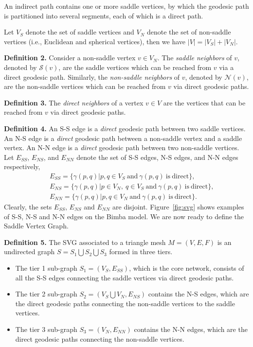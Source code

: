 An indirect path contains one or more saddle vertices, by which the
geodesic path is partitioned into several segments, each of which is
a direct path.

Let $V_S$ denote the set of saddle vertices and $V_N$ denote the set
of non-saddle vertices (i.e., Euclidean and spherical vertices),
then we have $|V|=|V_S|+|V_N|$.

\noindent\textbf{Definition 2.} Consider a non-saddle vertex $v\in
V_N$. The \textit{saddle neighbors} of $v$, denoted by
$\mathcal{S}(v)$, are the saddle vertices which can be reached from
$v$ via a direct geodesic path. Similarly, the \textit{non-saddle
neighbors} of $v$, denoted by $\mathcal{N}(v)$, are the non-saddle
vertices which can be reached from $v$ via direct geodesic paths.

\noindent\textbf{Definition 3.} The \textit{direct neighbors} of a
vertex $v\in V$ are the vertices that can be reached from $v$
via direct geodesic paths.

\noindent\textbf{Definition 4.} An S-S edge is a \textit{direct}
geodesic path between two saddle vertices. An N-S edge is a
\textit{direct} geodesic path between a non-saddle vertex and a
saddle vertex. An N-N edge is a \textit{direct} geodesic path
between two non-saddle vertices. Let $E_{SS}$, $E_{NS}$, and
$E_{NN}$ denote the set of S-S edges, N-S edges, and N-N edges
respectively,
\begin{eqnarray}
\nonumber & &E_{SS}=\{\gamma(p,q)|p,q\in
V_S~\mathrm{and}~\gamma(p,q)~\mathrm{is~direct}\},\\
\nonumber & &E_{NS}=\{\gamma(p,q)|p\in V_N, ~q\in
V_S~\mathrm{and}~\gamma(p,q)~\mathrm{is~direct}\}, \\
\nonumber & &E_{NN}=\{\gamma(p,q)|p,q\in
V_N~\mathrm{and}~\gamma(p,q)~\mathrm{is~direct}\}.
\end{eqnarray}
Clearly, the sets $E_{SS}$, $E_{NS}$ and $E_{NN}$ are disjoint.
Figure~\ref{fig:svg} shows examples of S-S, N-S and N-N edges on the
Bimba model. We are now ready to define the Saddle Vertex Graph.

\noindent\textbf{Definition 5.} The SVG associated to a triangle
mesh $M=(V,E,F)$ is an undirected graph $S=S_1\bigcup S_2\bigcup
S_3$ formed in three tiers.
\begin{itemize}
\item  The tier 1 sub-graph $S_1=(V_S, E_{SS})$, which is the core network, consists of all
the S-S edges connecting the saddle vertices via direct geodesic
paths.
\item The tier 2 sub-graph $S_2=(V_S\bigcup V_N, E_{NS})$ contains the N-S edges, which are
the direct geodesic paths connecting the non-saddle vertices to the
saddle vertices.
\item The tier 3 sub-graph $S_3=(V_N,E_{NN})$ contains the N-N edges, which are the
direct geodesic paths connecting the non-saddle vertices.
\end{itemize}

